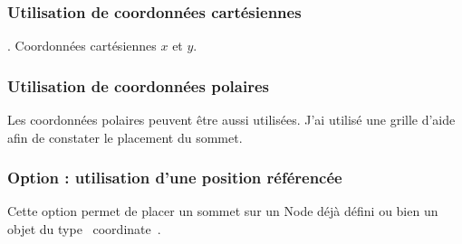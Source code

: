 \subsubsection{Utilisation de coordonnées cartésiennes} 
.  Coordonnées cartésiennes $x$ et $y$.

\begin{tkzexample}[latex=7cm,small]
\end{tkzexample}

\subsubsection{Utilisation de coordonnées polaires}

  Les coordonnées polaires peuvent être aussi utilisées. J'ai utilisé une grille d'aide afin de constater le placement du sommet.


\begin{tkzexample}[latex=7cm,small]
\end{tkzexample}





\subsubsection{Option  : utilisation d'une position référencée}
Cette option permet de placer un sommet sur un Node déjà défini ou bien
 un objet du type \og~coordinate~\fg.
\begin{tkzexample}[latex=7cm,small]
\end{tkzexample}


